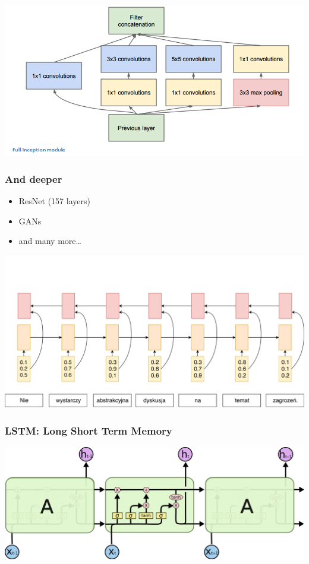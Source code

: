 \documentclass[11pt]{article}
\makeatletter
\def\maxwidth{\ifdim\Gin@nat@width>\linewidth\linewidth
    \else\Gin@nat@width\fi}
\let\Oldincludegraphics\includegraphics
\renewcommand{\includegraphics}[1]{\Oldincludegraphics[width=.8\maxwidth]{#1}}
\providecommand{\tightlist}{%
      \setlength{\itemsep}{0pt}\setlength{\parskip}{0pt}}
\makeatother
\begin{document}
\includegraphics{./GoogLeNet3.png}

    \hypertarget{and-deeper}{%
\subsubsection{And deeper}\label{and-deeper}}

\begin{itemize}
\tightlist
\item
  ResNet (157 layers)
\item
  GANs
\item
  and many more\ldots{}
\end{itemize}

    \includegraphics{./Encoder7-1.png}

    \hypertarget{lstm-long-short-term-memory}{%
\subsubsection{LSTM: Long Short Term
Memory}\label{lstm-long-short-term-memory}}

\includegraphics{./LSTM3-chain.png}
\end{document}
